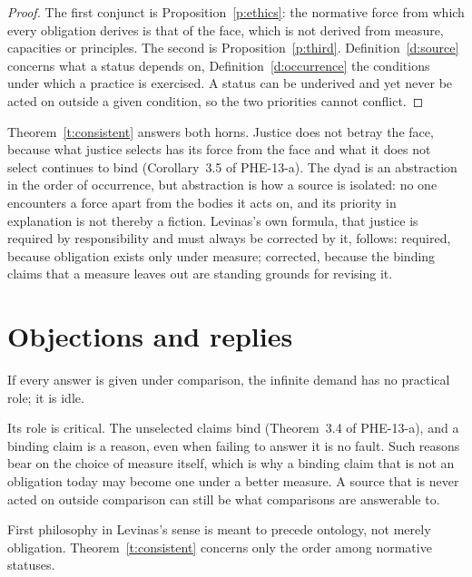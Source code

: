 \documentclass{situationist-preprint}
\begin{document}
\begin{proof}
The first conjunct is Proposition~\ref{p:ethics}: the normative force from which every obligation derives is that of the face, which is not derived from measure, capacities or principles. The second is Proposition~\ref{p:third}. Definition~\ref{d:source} concerns what a status depends on, Definition~\ref{d:occurrence} the conditions under which a practice is exercised. A status can be underived and yet never be acted on outside a given condition, so the two priorities cannot conflict.
\end{proof}

Theorem~\ref{t:consistent} answers both horns. Justice does not betray the face, because what justice selects has its force from the face and what it does not select continues to bind (Corollary~3.5 of PHE-13-a). The dyad is an abstraction in the order of occurrence, but abstraction is how a source is isolated: no one encounters a force apart from the bodies it acts on, and its priority in explanation is not thereby a fiction. Levinas's own formula, that justice is required by responsibility and must always be corrected by it, follows: required, because obligation exists only under measure; corrected, because the binding claims that a measure leaves out are standing grounds for revising it.

\section{Objections and replies}

\begin{objection}
If every answer is given under comparison, the infinite demand has no practical role; it is idle.
\end{objection}

\begin{reply}
Its role is critical. The unselected claims bind (Theorem~3.4 of PHE-13-a), and a binding claim is a reason, even when failing to answer it is no fault. Such reasons bear on the choice of measure itself, which is why a binding claim that is not an obligation today may become one under a better measure. A source that is never acted on outside comparison can still be what comparisons are answerable to.
\end{reply}

\begin{objection}
First philosophy in Levinas's sense is meant to precede ontology, not merely obligation. Theorem~\ref{t:consistent} concerns only the order among normative statuses.
\end{objection}
\end{document}
